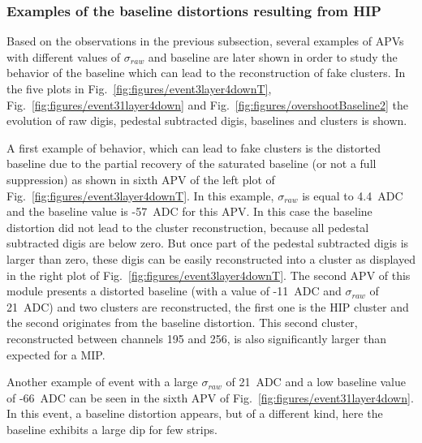 
\subsubsection{Examples of the baseline distortions resulting from HIP~\label{sec:distortion}}

Based on the observations in the previous subsection, several examples of APVs with different values of $\sigma_{raw}$ and baseline are later shown in order to study the behavior of the baseline which can lead to the reconstruction of fake clusters. In the five plots in Fig.~\ref{fig:figures/event3layer4downT},  Fig.~\ref{fig:figures/event31layer4down} and Fig.~\ref{fig:figures/overshootBaseline2} the evolution of raw digis, pedestal subtracted digis, baselines and clusters is shown. 

A first example of behavior, which can lead to fake clusters is the distorted baseline due to the partial recovery of the saturated baseline (or not a full suppression) as shown in sixth APV of the left plot of Fig.~\ref{fig:figures/event3layer4downT}. In this example, $\sigma_{raw}$ is equal to 4.4~ADC and the baseline value is -57~ADC for this APV. In this case the baseline distortion did not lead to the cluster reconstruction, because all pedestal subtracted digis are below zero. But once part of the pedestal subtracted digis is larger than zero, these digis can be easily reconstructed into a cluster as displayed in the right plot of  Fig.~\ref{fig:figures/event3layer4downT}. The second APV of this module presents a distorted baseline (with a value of -11~ADC and $\sigma_{raw}$ of 21~ADC) and two clusters are reconstructed, the first one is the HIP cluster and the second originates from the baseline distortion. This second cluster, reconstructed between channels 195 and 256, is also significantly larger than expected for a MIP. 

Another example of event with a large $\sigma_{raw}$ of 21~ADC and a low baseline value of -66~ADC can be seen in the sixth APV of Fig.~\ref{fig:figures/event31layer4down}. In this event, a baseline distortion appears, but of a different kind, here the baseline exhibits a large dip for few strips. 

